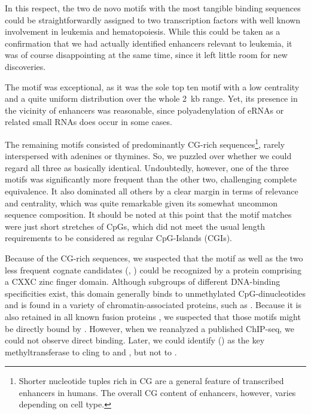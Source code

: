 In this respect, the two de novo motifs with the most tangible binding sequences could be straightforwardly assigned to two transcription factors with well known involvement in leukemia and hematopoiesis. While this could be taken as a confirmation that we had actually identified enhancers relevant to leukemia, it was of course disappointing at the same time, since it left little room for new discoveries. 

The motif \motifpolya was exceptional, as it was the sole top ten motif with a low centrality and a quite uniform distribution over the whole \SI{2}{\kilo b} range. Yet, its presence in the vicinity of enhancers was reasonable, since polyadenylation of eRNAs or related small RNAs does occur in some cases. %

The remaining motifs consisted of predominantly CG-rich sequences\footnote{Shorter nucleotide tuples rich in CG are a general feature of transcribed enhancers in humans\cite{Kleftogiannis2018}. The overall CG content of enhancers, however, varies depending on cell type\cite{Maricque2017}.}, rarely interspersed with adenines or thymines. So, we puzzled over whether we could regard all three as basically identical. Undoubtedly, however, one of the three motifs was significantly more frequent than the other two, challenging complete equivalence. It also dominated all others by a clear margin in terms of relevance and centrality, which was quite remarkable given its somewhat uncommon sequence composition. It should be noted at this point that the motif matches were just short stretches of CpGs, which did not meet the usual length requirements to be considered as regular CpG-Islands (CGIs). 

Because of the CG-rich sequences, we suspected that the motif \motifmlltwo as well as the two less frequent cognate candidates (\motifmlltwob, \motifmlltwoc) could be recognized by a protein comprising a CXXC zinc finger domain. Although subgroups of different DNA-binding specificities exist\cite{Xu2018a,Xue2019}, this domain generally binds to unmethylated CpG-dinucleotides and is found in a variety of chromatin-associated proteins, such as \cite{Allen2006}. Because it is also retained in all known  fusion proteins , we suspected that those motifs might be directly bound by \mllafnine. However, when we reanalyzed a published \mllafnine ChIP-seq\cite{Bernt2011}, we could not observe direct binding\dns.\label{chap:r:enhancers:motifs:berntcite} Later, we could identify  () as the key methyltransferase to cling to \motifmlltwo and \motifmlltwoc, but not to \motifmlltwob {}.

